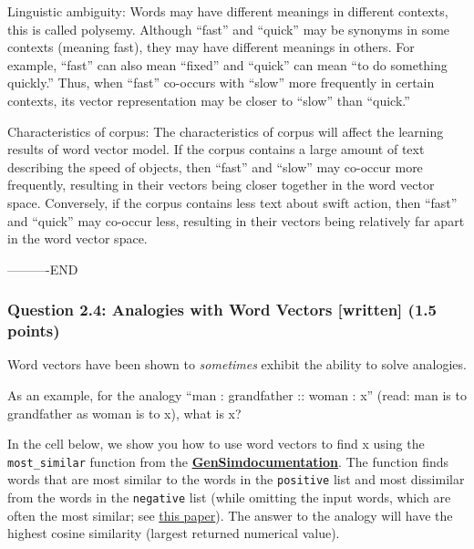 \documentclass[11pt]{article}
\begin{document}
Linguistic ambiguity: Words may have different meanings in different
contexts, this is called polysemy. Although ``fast'' and ``quick'' may
be synonyms in some contexts (meaning fast), they may have different
meanings in others. For example, ``fast'' can also mean ``fixed'' and
``quick'' can mean ``to do something quickly.'' Thus, when ``fast''
co-occurs with ``slow'' more frequently in certain contexts, its vector
representation may be closer to ``slow'' than ``quick.''

Characteristics of corpus: The characteristics of corpus will affect the
learning results of word vector model. If the corpus contains a large
amount of text describing the speed of objects, then ``fast'' and
``slow'' may co-occur more frequently, resulting in their vectors being
closer together in the word vector space. Conversely, if the corpus
contains less text about swift action, then ``fast'' and ``quick'' may
co-occur less, resulting in their vectors being relatively far apart in
the word vector space.

----------END

    \subsubsection{Question 2.4: Analogies with Word Vectors {[}written{]}
(1.5
points)}\label{question-2.4-analogies-with-word-vectors-written-1.5-points}

Word vectors have been shown to \emph{sometimes} exhibit the ability to
solve analogies.

As an example, for the analogy ``man : grandfather :: woman : x'' (read:
man is to grandfather as woman is to x), what is x?

In the cell below, we show you how to use word vectors to find x using
the \texttt{most\_similar} function from the \textbf{\href{https://radimrehurek.com/gensim/models/keyedvectors.html\#gensim.models.keyedvectors.KeyedVectors.most_similar}{GenSimdocumentation}}. The function finds words that are most similar to the
words in the \texttt{positive} list and most dissimilar from the words
in the \texttt{negative} list (while omitting the input words, which are
often the most similar; see
\href{https://www.aclweb.org/anthology/N18-2039.pdf}{this paper}). The
answer to the analogy will have the highest cosine similarity (largest
returned numerical value).
\end{document}
